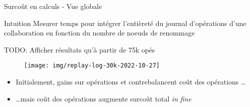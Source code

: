 \begin{frame}{Surcoût en calculs - Vue globale}
    \begin{block}{Intuition}
        Mesurer temps pour intégrer l'entièreté du journal d'opérations d'une collaboration en fonction du \alert{nombre de noeuds de renommage}
    \end{block}
    TODO: Afficher résultats qu'à partir de 75k opés
    \begin{figure}[!ht]
        \texttt{[image: img/replay-log-30k-2022-10-27]}
      \end{figure}
    \begin{itemize}
        \item Initialement, gains sur opérations \ins et \rmv contrebalancent coût des opérations \ren \dots
        \item \dots mais coût des opérations \ren augmente surcoût total \emph{in fine}
    \end{itemize}
\end{frame}
